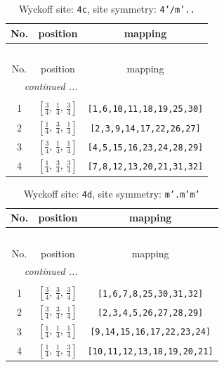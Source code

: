 \documentclass[fleqn,8pt]{jsarticle}
\begin{document}
\renewcommand{\arraystretch}{1.2}
\begin{longtable}{ccc}
\caption{Wyckoff site: {\tt 4c}, site symmetry: {\tt 4'/m'..}}
 \\
 \hline \hline
No. & position & mapping \\ \hline \endfirsthead

\multicolumn{2}{l}{\tablename\ \thetable{}} \\
 \hline \hline
No. & position & mapping \\ \hline \endhead

 \hline \hline
\multicolumn{2}{r}{\footnotesize\it continued ...} \\ \endfoot

 \hline \hline
\multicolumn{2}{r}{} \\ \endlastfoot

1 & $\left[ \frac{3}{4},\, \frac{1}{4},\, \frac{3}{4} \right]$ & {\tt [1,6,10,11,18,19,25,30]} \\ \hline
2 & $\left[ \frac{1}{4},\, \frac{3}{4},\, \frac{1}{4} \right]$ & {\tt [2,3,9,14,17,22,26,27]} \\ \hline
3 & $\left[ \frac{3}{4},\, \frac{1}{4},\, \frac{1}{4} \right]$ & {\tt [4,5,15,16,23,24,28,29]} \\ \hline
4 & $\left[ \frac{1}{4},\, \frac{3}{4},\, \frac{3}{4} \right]$ & {\tt [7,8,12,13,20,21,31,32]} \\
\end{longtable}
\renewcommand{\arraystretch}{1.2}
\begin{longtable}{ccc}
\caption{Wyckoff site: {\tt 4d}, site symmetry: {\tt m'.m'm'}}
 \\
 \hline \hline
No. & position & mapping \\ \hline \endfirsthead

\multicolumn{2}{l}{\tablename\ \thetable{}} \\
 \hline \hline
No. & position & mapping \\ \hline \endhead

 \hline \hline
\multicolumn{2}{r}{\footnotesize\it continued ...} \\ \endfoot

 \hline \hline
\multicolumn{2}{r}{} \\ \endlastfoot

1 & $\left[ \frac{3}{4},\, \frac{3}{4},\, \frac{3}{4} \right]$ & {\tt [1,6,7,8,25,30,31,32]} \\ \hline
2 & $\left[ \frac{3}{4},\, \frac{3}{4},\, \frac{1}{4} \right]$ & {\tt [2,3,4,5,26,27,28,29]} \\ \hline
3 & $\left[ \frac{1}{4},\, \frac{1}{4},\, \frac{1}{4} \right]$ & {\tt [9,14,15,16,17,22,23,24]} \\ \hline
4 & $\left[ \frac{1}{4},\, \frac{1}{4},\, \frac{3}{4} \right]$ & {\tt [10,11,12,13,18,19,20,21]} \\
\end{longtable}
\end{document}
